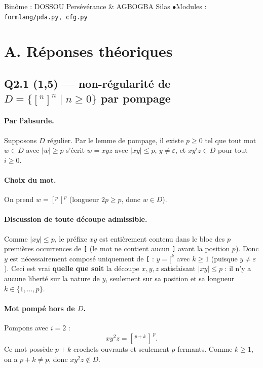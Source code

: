\documentclass[11pt,a4paper]{scrartcl}
\begin{document}
{Binôme : DOSSOU Persévérance \& AGBOGBA Silas \quad$\bullet$\quad Modules : \texttt{formlang/pda.py, cfg.py}}

\section*{A. Réponses théoriques}

\subsection*{Q2.1 (1,5) — non-régularité de $D=\{[^n]^n \mid n\ge 0\}$ par pompage}

\paragraph{Par l'absurde.} Supposons $D$ régulier. Par le lemme de pompage, il existe
$p\ge 0$ tel que tout mot $w\in D$ avec $|w|\ge p$ s'écrit $w=xyz$ avec $|xy|\le p$,
$y\neq\varepsilon$, et $xy^iz\in D$ pour tout $i\ge 0$.

\paragraph{Choix du mot.} On prend $w=[^p\,]^p$ (longueur $2p\ge p$, donc $w\in D$).

\paragraph{Discussion de toute découpe admissible.} Comme $|xy|\le p$, le préfixe $xy$
est entièrement contenu dans le bloc des $p$ premières occurrences de \texttt{[}
(le mot ne contient aucun \texttt{]} avant la position $p$). Donc $y$ est nécessairement
composé uniquement de \texttt{[} : $y=[^k$ avec $k\ge 1$ (puisque $y\neq\varepsilon$).
Ceci est vrai \textbf{quelle que soit} la découpe $x,y,z$ satisfaisant $|xy|\le p$ :
il n'y a aucune liberté sur la nature de $y$, seulement sur sa position et sa longueur
$k\in\{1,\dots,p\}$.

\paragraph{Mot pompé hors de $D$.} Pompons avec $i=2$ :
$$xy^2z = [^{\,p+k}\,]^{\,p}.$$
Ce mot possède $p+k$ crochets ouvrants et seulement $p$ fermants. Comme $k\ge 1$, on a
$p+k\neq p$, donc $xy^2z\notin D$.
\end{document}
